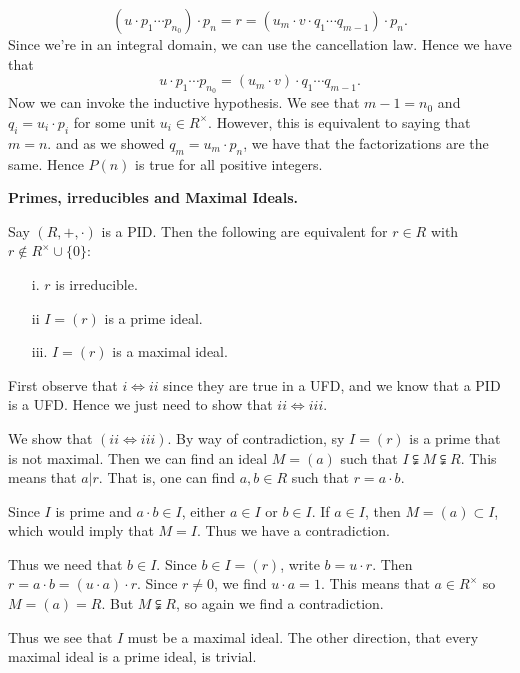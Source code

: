\documentclass[12pt,letterpaper]{algebra_book}
\theoremstyle{definition}
\begin{document}
\begin{prf}
\begin{description}
\begin{itemize}
\[                (u \cdot p_1 \cdots p_{n_0}) \cdot p_n
                = 
                r
                = 
                (u_m\cdot v \cdot  q_1 \cdots q_{m-1})\cdot p_n.
            \]
            Since we're in an integral domain, we can use the
            cancellation law. Hence we have that 
            \[
                u\cdot p_1 \cdots p_{n_0} = (u_m \cdot v)\cdot q_1 \cdots q_{m-1}.  
            \]
            Now we can invoke the inductive hypothesis. We see
            that $m - 1 = n_0$  and $q_i = u_i \cdot p_i$ for some
            unit $u_i \in R^{\times}$. However, this is equivalent
            to saying that $m = n$. and as we showed $q_m = u_m
            \cdot p_n$, we have that the factorizations are the
            same. Hence $P(n)$ is true for all positive integers. 
        \end{itemize}
    \end{description}
\end{prf}

\textbf{Primes, irreducibles and Maximal Ideals.}\\
\begin{proposition}
    Say $(R, +, \cdot)$ is a PID. Then the following are
    equivalent for  $r \in R$ with $r \not\in
    R^{\times}\cup\{0\}$:
    \begin{itemize}
        \item[i.] $r$ is irreducible.
        \item[ii] $I = (r)$ is a prime ideal.
        \item[iii.] $I=(r)$ is a maximal ideal.   
    \end{itemize}
\end{proposition}

\begin{prf}
    First observe that $i \iff ii$ since they are true in a UFD,
    and we know that a PID is a UFD. Hence we just need to show
    that $ii \iff iii$. 

    We show that $(ii \iff iii)$. By way of contradiction, sy $I =
    (r)$ is a prime that is not maximal. Then we can find an ideal
    $M = (a)$ such that $I \subsetneqq M \subsetneqq R$. This
    means that $a | r$. That is, one can find $a, b \in R$ such
    that $r = a\cdot b$. 

    Since $I$ is prime and $a \cdot b \in  I$, either $a \in I$ or
    $b \in I$. If $a \in I$, then $M = (a) \subset I$, which would
    imply that $M = I$. Thus we have a contradiction. 

    Thus we need that $b \in I$. Since $b \in I = (r)$, write $b =
    u \cdot r$. Then $r = a \cdot b = (u \cdot a) \cdot r$. Since
    $r \ne 0$, we find $u \cdot a = 1$. This means that $a \in
    R^\times$ so $M = (a) = R$. But $M \subsetneqq R$, so again we
    find a contradiction.

    Thus we see that $I$ must be a maximal ideal. The other
    direction, that every maximal ideal is a prime ideal, is trivial.
\end{prf}
\end{document}

